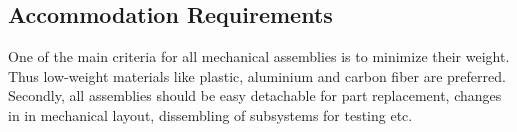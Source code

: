 \subsection{Accommodation Requirements}
%
One of the main criteria for all mechanical assemblies is to minimize their weight. Thus low-weight materials like plastic, aluminium and carbon fiber are preferred. Secondly, all assemblies should be easy detachable for part replacement, changes in in mechanical layout, dissembling of subsystems for testing etc.
%
%
%
%
%
%
